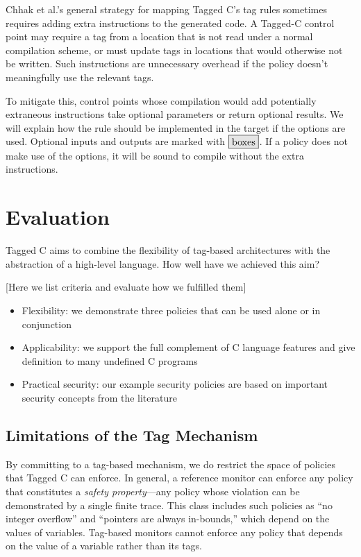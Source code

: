 \documentclass{llncs}
\begin{document}
Chhak et al.'s general strategy for mapping Tagged C's tag rules sometimes requires adding extra
instructions to the generated code. A Tagged-C control point
may require a tag from a location that is not read under a normal compilation scheme, or must update tags
in locations that would otherwise not be written. Such instructions are unnecessary overhead if the policy
doesn't meaningfully use the relevant tags.

To mitigate this, control points whose compilation would add potentially extraneous instructions
take optional parameters or return optional results. We will explain how the rule should be
implemented in the target if the options are used.
Optional inputs and outputs are marked with \(\optional{boxes}\). If a policy does not make use of the options, it will
be sound to compile without the extra instructions.

\section{Evaluation}
\label{sec:evaluation}

Tagged C aims to combine the flexibility of tag-based architectures with the abstraction
of a high-level language. How well have we achieved this aim?

[Here we list criteria and evaluate how we fulfilled them]

\begin{itemize}
\item Flexibility: we demonstrate three policies that can be used alone or in conjunction
\item Applicability: we support the full complement of C language features and give definition
  to many undefined C programs
\item Practical security: our example security policies are based on important security concepts
  from the literature
\end{itemize}

\subsection{Limitations of the Tag Mechanism}

By committing to a tag-based mechanism, we do restrict the space of policies that Tagged C
can enforce. In general, a reference monitor can enforce any policy that constitutes a
{\em safety property}---any policy whose violation can be demonstrated by a single finite
trace. This class includes such policies as ``no integer overflow'' and ``pointers are always in-bounds,''
which depend on the values of variables. Tag-based monitors cannot enforce any policy that
depends on the value of a variable rather than its tags.
\end{document}

